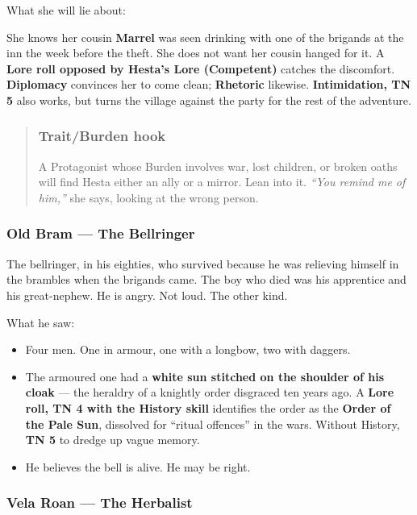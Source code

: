 \documentclass[10pt,a4paper]{article}
\newcommand{\tightlist}{\setlength{\itemsep}{0pt}\setlength{\parskip}{0pt}}
\begin{document}
What she will lie about:

She knows her cousin \textbf{Marrel} was seen drinking with one of the brigands at the inn the week before the theft. She does not want her cousin hanged for it. A \textbf{Lore roll opposed by Hesta’s Lore (Competent)} catches the discomfort. \textbf{Diplomacy} convinces her to come clean; \textbf{Rhetoric} likewise. \textbf{Intimidation, TN 5} also works, but turns the village against the party for the rest of the adventure.

\begin{quote}
\subsubsection{Trait/Burden hook}\label{traitburden-hook}

A Protagonist whose Burden involves war, lost children, or broken oaths will find Hesta either an ally or a mirror. Lean into it. \emph{“You remind me of him,”} she says, looking at the wrong person.
\end{quote}

\subsubsection{Old Bram --- The Bellringer}\label{old-bram--the-bellringer}

The bellringer, in his eighties, who survived because he was relieving himself in the brambles when the brigands came. The boy who died was his apprentice and his great-nephew. He is angry. Not loud. The other kind.

What he saw:

\begin{itemize}
\tightlist
\item
  Four men. One in armour, one with a longbow, two with daggers.
\item
  The armoured one had a \textbf{white sun stitched on the shoulder of his cloak} --- the heraldry of a knightly order disgraced ten years ago. A \textbf{Lore roll, TN 4 with the History skill} identifies the order as the \textbf{Order of the Pale Sun}, dissolved for “ritual offences” in the wars. Without History, \textbf{TN 5} to dredge up vague memory.
\item
  He believes the bell is alive. He may be right.
\end{itemize}

\subsubsection{Vela Roan --- The Herbalist}\label{vela-roan--the-herbalist}
\end{document}
